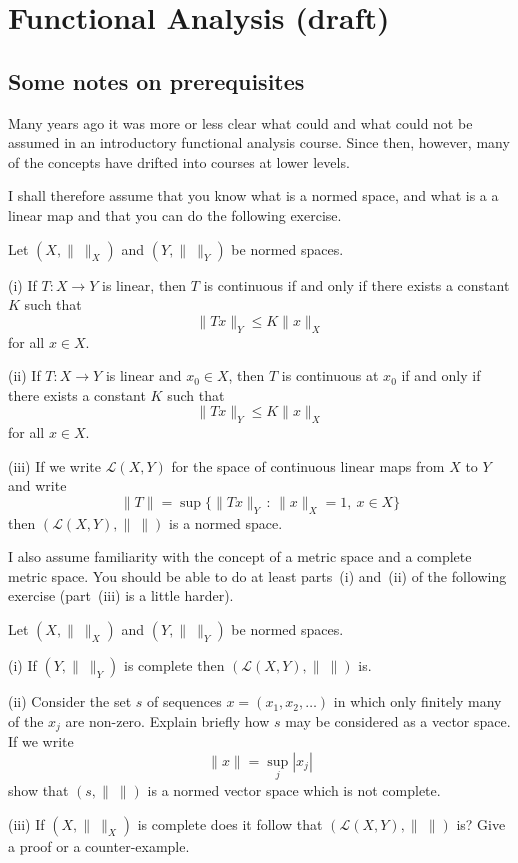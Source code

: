 \chapter{Functional Analysis (draft)}

\section{Some notes on prerequisites} Many years ago
it was more or less clear what could and what could
not be assumed in an introductory functional analysis
course. Since then, however, many of the concepts
have drifted into courses at lower levels. 

I shall therefore assume that you know what is a normed space,
and what is a
a linear map and that you can do the following exercise.
\begin{exercise} Let $(X,\|\ \|_{X})$ and $(Y,\|\ \|_{Y})$
be normed spaces.

(i) If $T:X\rightarrow Y$ is linear, then $T$ is continuous
if and only if there exists a constant $K$ such that
\[\|Tx\|_{Y}\leq K\|x\|_{X}\]
for all $x\in X$.

(ii) If $T:X\rightarrow Y$ is linear and $x_{0}\in X$,
then $T$ is continuous at $x_{0}$
if and only if there exists a constant $K$ such that
\[\|Tx\|_{Y}\leq K\|x\|_{X}\]
for all $x\in X$. 

(iii) If we write ${\mathcal L}(X,Y)$ for the space of continuous
linear maps from $X$ to $Y$ and write
\[\|T\|=\sup\{\|Tx\|_{Y}\,:\, \|x\|_{X}=1,\ x\in X\}\]
then $({\mathcal L}(X,Y),\|\ \|)$  is a normed space.
\end{exercise}

I also assume familiarity with the concept of a metric
space and a complete metric space. You should be able
to do at least parts~(i) and~(ii) of the following exercise
(part~(iii) is a little harder).
\begin{exercise}  Let $(X,\|\ \|_{X})$ and $(Y,\|\ \|_{Y})$
be normed spaces.

(i) If $(Y,\|\ \|_{Y})$ is complete then 
$({\mathcal L}(X,Y),\|\ \|)$ is.

(ii) Consider the set $s$ of sequences $x=(x_{1},x_{2},\dots)$
in which only finitely many of the $x_{j}$ are non-zero.
Explain briefly how $s$ may be considered as a vector space.
If we write
\[\|x\|=\sup_{j}|x_{j}|\]
show that $(s,\|\ \|)$ is a normed vector space which
is not complete.

(iii) If $(X,\|\ \|_{X})$ is complete does it follow that 
$({\mathcal L}(X,Y),\|\ \|)$ is? Give a proof or a counter-example.
\end{exercise}

